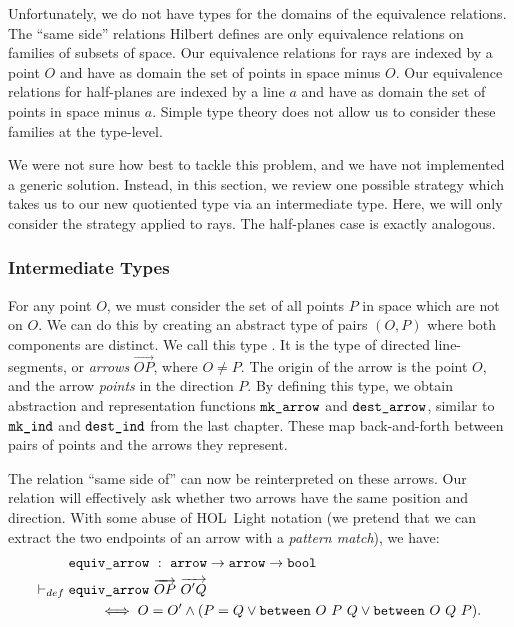 Unfortunately, we do not have types for the domains of the equivalence relations. The ``same side'' relations Hilbert defines are only equivalence relations on families of subsets of space. Our equivalence relations for rays are indexed by a point $O$ and have as domain the set of points in space minus $O$. Our equivalence relations for half-planes are indexed by a line $a$ and have as domain the set of points in space minus $a$. Simple type theory does not allow us to consider these families at the type-level.

We were not sure how best to tackle this problem, and we have not implemented a generic solution. Instead, in this section, we review one possible strategy which takes us to our new quotiented type via an intermediate type. Here, we will only consider the strategy applied to rays. The half-planes case is exactly analogous.

\subsubsection{Intermediate Types}
For any point $O$, we must consider the set of all points $P$ in space which are not on $O$. We can do this by creating an abstract type of pairs $(O,P)$ where both components are distinct. We call this type . It is the type of directed line-segments, or \emph{arrows} $\overrightarrow{OP}$, where $O \neq P$. The origin of the arrow is the point $O$, and the arrow \emph{points} in the direction $P$. By defining this type, we obtain abstraction and representation functions $\texttt{mk\_arrow}$ and $\texttt{dest\_arrow}$, similar to $\texttt{mk\_ind}$ and $\texttt{dest\_ind}$ from the last chapter. These map back-and-forth between pairs of points and the arrows they represent.

The relation ``same side of'' can now be reinterpreted on these arrows. Our relation will effectively ask whether two arrows have the same position and direction. With some abuse of HOL~Light notation (we pretend that we can extract the two endpoints of an arrow with a \emph{pattern match}), we have:
\begin{equation}\label{eq:EquivArrowDef}
  \begin{split}
    &\code{equiv\_arrow}\ :\ \code{arrow} \rightarrow \code{arrow}\rightarrow \code{bool}\\
    \vdash_{def}\; &\code{equiv\_arrow}\ \overrightarrow{OP}\ \overrightarrow{O'Q}\\
    &\qquad\iff O = O' \wedge (P = Q \vee \between{O}{P}{Q} \vee \between{O}{Q}{P}).
  \end{split}
\end{equation}

